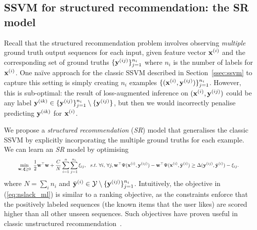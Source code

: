 \secmoveup
\subsection{SSVM for structured recommendation: the SR model}
\label{ssec:sr}
\textmoveup

Recall that the structured recommendation problem
involves observing \emph{multiple} ground truth output sequences for each input, \ie
given feature vector $\mathbf{x}^{(i)}$ and the corresponding set of ground truths $\{\mathbf{y}^{(ij)}\}_{j=1}^{n_i}$
where $n_i$ is the number of labels for $\mathbf{x}^{(i)}$.
One na\"{i}ve approach for the classic SSVM described in Section~\ref{ssec:ssvm} to capture this setting is simply creating 
$n_i$ examples $\{(\mathbf{x}^{(i)}, \mathbf{y}^{(ij)})\}_{j=1}^{n_i}$. 
However, this is sub-optimal:
the result of loss-augmented inference on $(\mathbf{x}^{(i)}, \mathbf{y}^{(ij)})$ could be any label $\mathbf{y}^{(ik)} \in \{\mathbf{y}^{(ij)}\}_{j=1}^{n_i} \setminus \{\mathbf{y}^{(ij)}\}$,
but then we would incorrectly penalise predicting $\mathbf{y}^{(ik)}$ for $\mathbf{x}^{(i)}$. 

We propose a \emph{structured recommendation} (\emph{SR}) model that generalises the classic SSVM by explicitly incorporating the multiple ground truths for each example.
We can learn an \emph{SR} model by optimising %
\begin{equation}
\label{eq:nslack_ml}
\resizebox{0.93\linewidth}{!}{$
\begin{aligned}
\min_{\w, \, \bm{\xi} \ge 0} ~ \frac{1}{2} \w^\top \w + \frac{C}{N} \sum_{i=1}^n \sum_{j=1}^{n_i} \xi_{ij}, ~~s.t.~ \forall i, \, \forall j, 
  \w^\top \Psi(\x^{(i)}, \y^{(ij)}) - \w^\top \Psi(\x^{(i)}, \bar{\y}^{(i)}) \ge
  \Delta(\y^{(ij)}, \bar{\y}^{(i)}) - \xi_{ij}.
\end{aligned}
$}
\end{equation}
where $N = \sum_i n_i$ and $\bar{\mathbf{y}}^{(i)} \in \mathcal{Y} \setminus \{\mathbf{y}^{(ij)}\}_{j=1}^{n_i}$.
Intuitively, the objective in (\ref{eq:nslack_ml}) is similar to a ranking objective, as the constraints enforce
that the positively labeled sequences (the known items that the user likes) are scored
higher than all other unseen sequences.
Such objectives have proven useful in classic unstructured recommendation~\cite{bpr09}.

